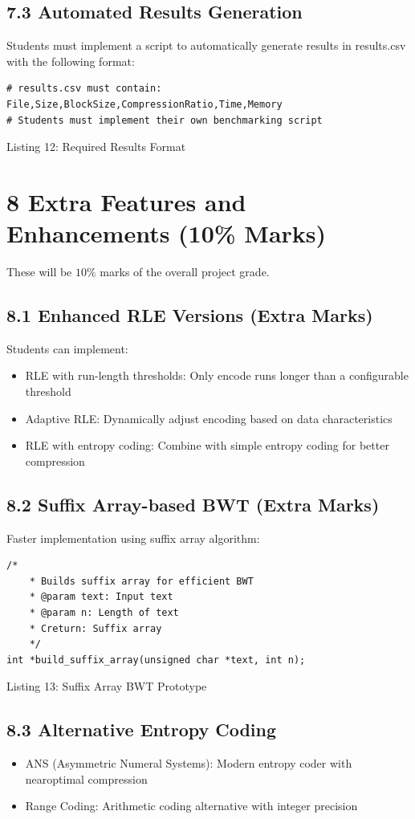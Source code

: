 \documentclass[10pt]{article}
\begin{document}
\subsection*{7.3 Automated Results Generation}
Students must implement a script to automatically generate results in results.csv with the following format:

\begin{verbatim}
# results.csv must contain:
File,Size,BlockSize,CompressionRatio,Time,Memory
# Students must implement their own benchmarking script
\end{verbatim}

Listing 12: Required Results Format

\section*{8 Extra Features and Enhancements (10\% Marks)}
These will be $10 \%$ marks of the overall project grade.

\subsection*{8.1 Enhanced RLE Versions (Extra Marks)}
Students can implement:

\begin{itemize}
  \item RLE with run-length thresholds: Only encode runs longer than a configurable threshold
  \item Adaptive RLE: Dynamically adjust encoding based on data characteristics
  \item RLE with entropy coding: Combine with simple entropy coding for better compression
\end{itemize}

\subsection*{8.2 Suffix Array-based BWT (Extra Marks)}
Faster implementation using suffix array algorithm:

\begin{verbatim}
/*
    * Builds suffix array for efficient BWT
    * @param text: Input text
    * @param n: Length of text
    * Creturn: Suffix array
    */
int *build_suffix_array(unsigned char *text, int n);
\end{verbatim}

Listing 13: Suffix Array BWT Prototype

\subsection*{8.3 Alternative Entropy Coding}
\begin{itemize}
  \item ANS (Asymmetric Numeral Systems): Modern entropy coder with nearoptimal compression
  \item Range Coding: Arithmetic coding alternative with integer precision
\end{itemize}
\end{document}
